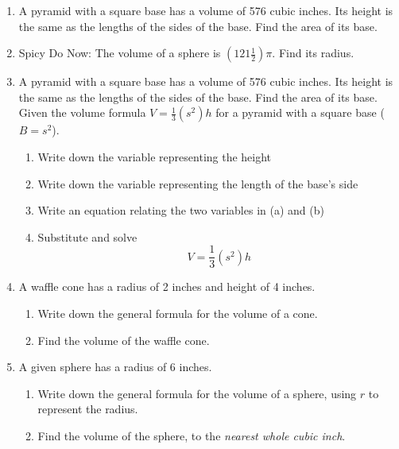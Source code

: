 \begin{enumerate}
\item A pyramid with a square base has a volume of 576 cubic inches. Its height is the same as the lengths of the sides of the base. Find the area of its base.

\item Spicy Do Now: The volume of a sphere is $(121 \frac{1}{2}) \pi$. Find its radius. \vspace{1cm}

\item A pyramid with a square base has a volume of 576 cubic inches. Its height is the same as the lengths of the sides of the base. Find the area of its base.\\[0.5cm] Given the volume formula $V=\frac{1}{3}(s^2)h$ for a pyramid with a square base ($B=s^2$).
\begin{enumerate}[itemsep=0.5cm]
  \item Write down the variable representing the height
  \item Write down the variable representing the length of the base's side
  \item Write an equation relating the two variables in (a) and (b)
  \item Substitute and solve \[V=\frac{1}{3}(s^2)h\]
\end{enumerate} \vspace{2cm}

\item A waffle cone has a radius of 2 inches and height of 4 inches. 
\begin{enumerate}
  \item Write down the general formula for the volume of a cone. \vspace{1cm}
  \item Find the volume of the waffle cone.
\end{enumerate}  \vspace{3cm}

\item A given sphere has a radius of 6 inches.
\begin{enumerate}
  \item Write down the general formula for the volume of a sphere, using $r$ to represent the radius. \vspace{1cm}
  \item Find the volume of the sphere, to the \emph{nearest whole cubic inch}.
\end{enumerate}  \vspace{3cm}


\end{enumerate}
